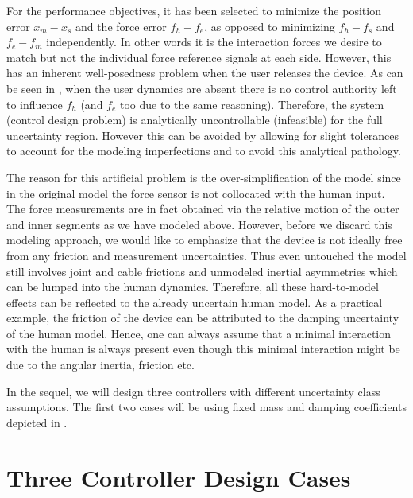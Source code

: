 For the performance objectives, it has been selected to minimize the position error $x_m-x_s$ and 
the force error $f_h-f_e$, as opposed to minimizing $f_h-f_s$ and $f_e-f_m$ independently. In other words
it is the interaction forces we desire to match but not the individual force reference signals at each side. 
However, this has an inherent well-posedness problem when the user releases the device. As can be seen in 
, when the user dynamics are absent there is no control authority left to influence 
$f_h$ (and $f_e$ too due to the same reasoning). Therefore, the system (control design problem) is analytically 
uncontrollable (infeasible) for the full uncertainty region. However this can be avoided by allowing for 
slight tolerances to account for the modeling imperfections and to avoid this analytical pathology. 

The reason for this artificial problem is the over-simplification of the model since in the original model 
the force sensor is not collocated with the human input. The force measurements are in fact obtained 
via the relative motion of the outer and inner segments as we have modeled above. However, before we discard 
this modeling approach, we would like to emphasize that the device is not ideally free from any friction and 
measurement uncertainties. Thus even untouched the model still involves joint and cable frictions and unmodeled
inertial asymmetries which can be lumped into the human dynamics. Therefore, all these hard-to-model effects 
can be reflected to the already uncertain human model. As a practical example, the friction of the device can 
be attributed to the damping uncertainty of the human model. Hence, one can always assume that a minimal 
interaction with the human is always present even though this minimal interaction might be due to the angular 
inertia, friction etc. 

In the sequel, we will design three controllers with different uncertainty class assumptions. The first two 
cases will be using fixed mass and damping coefficients depicted in . 

\section{Three Controller Design Cases}



